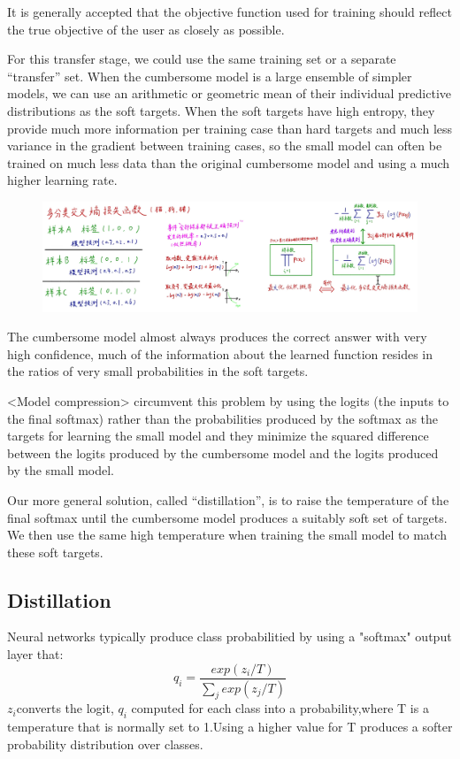 \documentclass[11pt]{article}
\begin{document}
It is generally accepted that the objective function used for training should reflect the true objective of the user as closely as possible.

For this transfer stage, we could use the same training set or a separate “transfer” set. When the cumbersome model is a large ensemble of simpler models, we can use an arithmetic or geometric mean of their individual predictive distributions as the soft targets. When the soft targets have high entropy, they provide much more information per training case than hard targets and much less variance in the gradient between training cases, so the small model can often be trained on much less data than the original cumbersome model and using a much higher learning rate.


\begin{figure}[H]
	\centering
	\includegraphics[scale = 0.3]{89}
\end{figure}
The cumbersome model almost always produces the correct answer with very high confidence, much of the information about the learned function resides in the ratios of very small probabilities in the soft targets.

<Model compression> circumvent this problem by using the logits (the inputs to the final
softmax) rather than the probabilities produced by the softmax as the targets for learning the small model and they minimize the squared difference between the logits produced by the cumbersome
model and the logits produced by the small model.

Our more general solution, called “distillation”, is to raise the temperature of the final softmax until the cumbersome model produces a suitably soft set of targets. We then use the same high temperature when training the small model to match these soft targets.

\subsection{Distillation}
Neural networks typically produce class probabilitied by using a "softmax" output layer that:
$$q_i = \frac{exp(z_i/T)}{\sum_{j}exp(z_j/T)}$$
$z_i$converts the logit, $q_i$ computed for each class into a probability,where T is a temperature that is normally set to 1.Using a higher value for T produces a softer probability distribution over classes.
\end{document}
